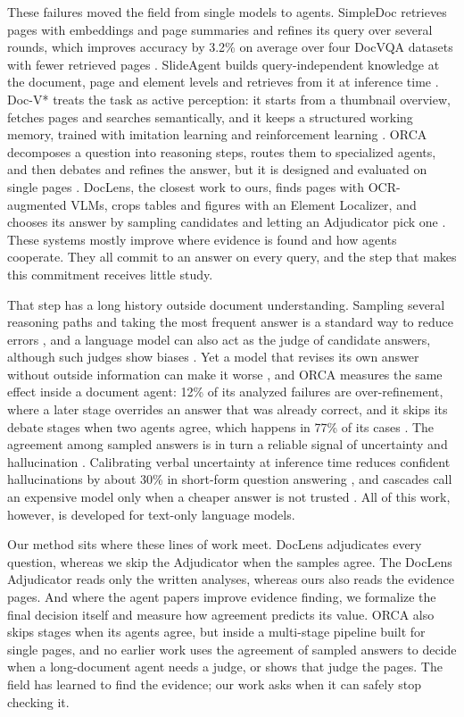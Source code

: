 These failures moved the field from single models to agents. SimpleDoc retrieves pages with embeddings and page summaries and refines its query over several rounds, which improves accuracy by 3.2\% on average over four DocVQA datasets with fewer retrieved pages \cite{jain2025simpledoc}. SlideAgent builds query-independent knowledge at the document, page and element levels and retrieves from it at inference time \cite{slideagent}. Doc-V* treats the task as active perception: it starts from a thumbnail overview, fetches pages and searches semantically, and it keeps a structured working memory, trained with imitation learning and reinforcement learning \cite{docvstar}. ORCA decomposes a question into reasoning steps, routes them to specialized agents, and then debates and refines the answer, but it is designed and evaluated on single pages \cite{orca}. DocLens, the closest work to ours, finds pages with OCR-augmented VLMs, crops tables and figures with an Element Localizer, and chooses its answer by sampling candidates and letting an Adjudicator pick one \cite{zhu2025doclens}. These systems mostly improve where evidence is found and how agents cooperate. They all commit to an answer on every query, and the step that makes this commitment receives little study.

That step has a long history outside document understanding. Sampling several reasoning paths and taking the most frequent answer is a standard way to reduce errors \cite{wang2023selfconsistency}, and a language model can also act as the judge of candidate answers, although such judges show biases \cite{zheng2023judging}. Yet a model that revises its own answer without outside information can make it worse \cite{huang2024selfcorrect}, and ORCA measures the same effect inside a document agent: 12\% of its analyzed failures are over-refinement, where a later stage overrides an answer that was already correct, and it skips its debate stages when two agents agree, which happens in 77\% of its cases \cite{orca}. The agreement among sampled answers is in turn a reliable signal of uncertainty and hallucination \cite{kuhn2023semantic,manakul2023selfcheckgpt}. Calibrating verbal uncertainty at inference time reduces confident hallucinations by about 30\% in short-form question answering \cite{ji2025verbal}, and cascades call an expensive model only when a cheaper answer is not trusted \cite{chen2024frugalgpt}. All of this work, however, is developed for text-only language models.

Our method sits where these lines of work meet. DocLens adjudicates every question, whereas we skip the Adjudicator when the samples agree. The DocLens Adjudicator reads only the written analyses, whereas ours also reads the evidence pages. And where the agent papers improve evidence finding, we formalize the final decision itself and measure how agreement predicts its value. ORCA also skips stages when its agents agree, but inside a multi-stage pipeline built for single pages, and no earlier work uses the agreement of sampled answers to decide when a long-document agent needs a judge, or shows that judge the pages. The field has learned to find the evidence; our work asks when it can safely stop checking it.

